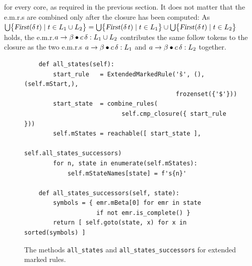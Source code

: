for every core, as required in the previous section.  It does not matter that the e.m.r.s are combined only after
the closure has been computed:  As
\\[0.2cm]
\hspace*{1.3cm}
$\bigcup \bigl\{ \textsl{First}(\delta\, t) \mid t \in L_1 \cup L_2 \bigr\} =
 \bigcup \bigl\{ \textsl{First}(\delta\, t) \mid t \in L_1 \bigr\} \cup
 \bigcup \bigl\{ \textsl{First}(\delta\, t) \mid t \in L_2 \bigr\}$
\\[0.2cm]
holds, the e.m.r.\@ $a \rightarrow \beta \mdot c\, \delta: L_1 \cup L_2$ contributes the same follow tokens to
the closure as the two e.m.r.s $a \rightarrow \beta \mdot c\, \delta: L_1$ and
$a \rightarrow \beta \mdot c\, \delta: L_2$ together.

\begin{figure}[!ht]
\centering
\begin{verbatim}
    def all_states(self):
        start_rule   = ExtendedMarkedRule('ŝ', (), (self.mStart,),
                                          frozenset({'$'}))
        start_state  = combine_rules(
                           self.cmp_closure({ start_rule }))
        self.mStates = reachable([ start_state ],
                                 self.all_states_successors)
        for n, state in enumerate(self.mStates):
            self.mStateNames[state] = f's{n}'

    def all_states_successors(self, state):
        symbols = { emr.mBeta[0] for emr in state
                    if not emr.is_complete() }
        return [ self.goto(state, x) for x in sorted(symbols) ]
\end{verbatim}
\vspace*{-0.3cm}
\caption{The methods \texttt{all\_states} and \texttt{all\_states\_successors} for extended marked rules.}
\label{fig:05-LR-Table-Generator.ipynb:all_states}
\end{figure} %


